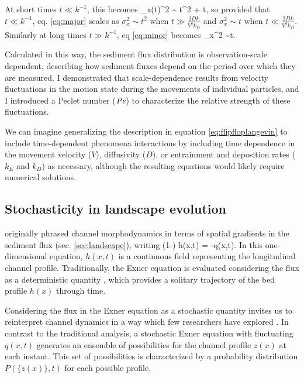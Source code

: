 At short times $t\ll k^{-1}$, this becomes
\be \sigma_x(t)^2 \sim {} t^2 + t, \label{eq:major}\ee
so provided that $t\ll k^{-1}$, eq. \ref{eq:major} scales as $\sigma_x^2 \sim t^2$ when $t \gg \frac{2Dk}{V^2 k_D}$ and $\sigma_x^2 \sim t$ when $t \ll \frac{2Dk}{V^2 k_D}$.
Similarly at long times $t\gg k^{-1}$, eq \ref{eq:minor} becomes
\be \sigma_x^2 \sim {}t. \ee









Calculated in this way, the sediment flux distribution is observation-scale dependent, describing how sediment fluxes depend on the period over which they are measured. I demonstrated that scale-dependence results from velocity fluctuations in the motion state during the movements of individual particles, and I introduced a Peclet number ($\mbox{\textit{Pe}}$) to characterize the relative strength of these fluctuations.


We can imagine generalizing the description in equation \ref{eq:flipfloplangevin} to include time-dependent phenomena interactions by including time dependence in the movement velocity ($V$), diffusivity ($D$), or entrainment and deposition rates ($k_E$ and $k_D$) as necessary, although the resulting equations would likely require numerical solutions.



 

\subsection{Stochasticity in landscape evolution}

\citet{Exner1925} originally phrased channel morphodynamics in terms of spatial gradients in the sediment flux (sec. \ref{sec:landscape}), writing
\be (1-\phi) \pt h(x,t) = -\px q(x,t). \label{eq:stocEx}\ee
In this one-dimensional equation, $h(x,t)$ is a continuous field representing the longitudinal channel profile.
Traditionally, the Exner equation is evaluated considering the flux as a deterministic quantity \citep{Parker2007,Viparelli2011,An2017}, which provides a solitary trajectory of the bed profile $h(x)$ through time.

Considering the flux in the Exner equation as a stochastic quantity invites us to reinterpret channel dynamics in a way which few researchers have explored \citep{Jerolmack2005,Bohorquez2016}.
In contrast to the traditional analysis, a stochastic Exner equation with fluctuating $q(x,t)$ generates an ensemble of possibilities for the channel profile $z(x)$ at each instant. This set of possibilities is characterized by a probability distribution $P(\{z(x)\},t)$ for each possible profile.

